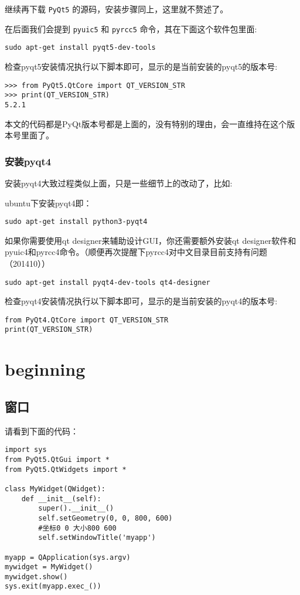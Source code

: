 \documentclass[11pt,oneside]{article}
\begin{document}
继续再下载 \texttt{PyQt5} 的源码，安装步骤同上，这里就不赘述了。


在后面我们会提到 \texttt{pyuic5} 和 \texttt{pyrcc5} 命令，其在下面这个软件包里面: 
\begin{verbatim}
sudo apt-get install pyqt5-dev-tools
\end{verbatim}

检查pyqt5安装情况执行以下脚本即可，显示的是当前安装的pyqt5的版本号:
\begin{Verbatim}
>>> from PyQt5.QtCore import QT_VERSION_STR
>>> print(QT_VERSION_STR)
5.2.1
\end{Verbatim}

本文的代码都是PyQt版本号都是上面的，没有特别的理由，会一直维持在这个版本号里面了。

\subsubsection{安装pyqt4}
\label{sec:orgheadline3}
安装pyqt4大致过程类似上面，只是一些细节上的改动了，比如:

ubuntu下安装pyqt4即：
\begin{verbatim}
sudo apt-get install python3-pyqt4
\end{verbatim}


如果你需要使用qt designer来辅助设计GUI，你还需要额外安装qt designer软件和pyuic4和pyrcc4命令。（顺便再次提醒下pyrcc4对中文目录目前支持有问题（201410）） 
\begin{verbatim}
sudo apt-get install pyqt4-dev-tools qt4-designer
\end{verbatim}


检查pyqt4安装情况执行以下脚本即可，显示的是当前安装的pyqt4的版本号:
\begin{verbatim}
from PyQt4.QtCore import QT_VERSION_STR
print(QT_VERSION_STR)
\end{verbatim}



\section{beginning}
\label{sec:orgheadline18}
\subsection{窗口}
\label{sec:orgheadline6}
请看到下面的代码：
\begin{verbatim}
import sys
from PyQt5.QtGui import *
from PyQt5.QtWidgets import *

class MyWidget(QWidget):
    def __init__(self):
        super().__init__()
        self.setGeometry(0, 0, 800, 600)
        #坐标0 0 大小800 600
        self.setWindowTitle('myapp')

myapp = QApplication(sys.argv)
mywidget = MyWidget()
mywidget.show()
sys.exit(myapp.exec_())
\end{verbatim}
\end{document}
